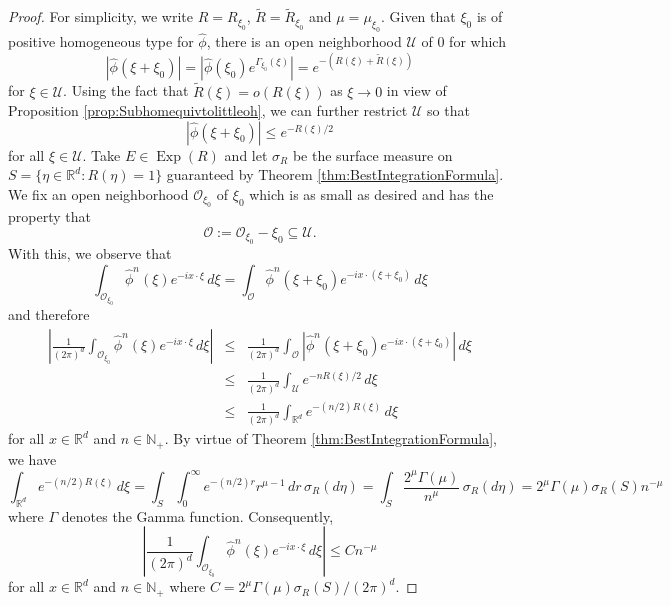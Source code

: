 \documentclass[11pt]{article}
\theoremstyle{remark}
\newcommand\Exp{\operatorname{Exp}}
\begin{document}
\begin{proof}
For simplicity, we write $R=R_{\xi_0}$, $\widetilde{R}=\widetilde{R}_{\xi_0}$ and $\mu=\mu_{\xi_0}$. Given that $\xi_0$ is of positive homogeneous type for $\widehat{\phi}$, there is an open neighborhood $\mathcal{U}$ of $0$ for which
\begin{equation*}
    \left|\widehat{\phi}(\xi+\xi_0)\right|=\left|\widehat{\phi}(\xi_0)e^{\Gamma_{\xi_0}(\xi)}\right|=e^{-\left(R(\xi)+\widetilde{R}(\xi)\right)}
\end{equation*}
for $\xi\in \mathcal{U}$. Using the fact that $\widetilde{R}(\xi)=o(R(\xi))$ as $\xi\to 0$ in view of Proposition \ref{prop:Subhomequivtolittleoh}, we can further restrict $\mathcal{U}$ so that
\begin{equation*}
    \left|\widehat{\phi}(\xi+\xi_0)\right|\leq e^{-R(\xi)/2}
\end{equation*}
for all $\xi\in\mathcal{U}$. Take $E\in\Exp(R)$ and let $\sigma_R$ be the surface measure on  $S=\{\eta\in\mathbb{R}^d:R(\eta)=1\}$ guaranteed by Theorem \ref{thm:BestIntegrationFormula}. We fix an open neighborhood $\mathcal{O}_{\xi_0}$ of $\xi_0$ which is as small as desired and has the property that
\begin{equation*}
    \mathcal{O}:=\mathcal{O}_{\xi_0}-\xi_0\subseteq\mathcal{U}.
\end{equation*}
With this, we observe that
\begin{equation}\label{eq:WlogCenterAtZero}
\int_{\mathcal{O}_{\xi_0}}\widehat{\phi}^n(\xi)e^{-ix\cdot\xi}\,d\xi=\int_{\mathcal{O}}\widehat{\phi}^n(\xi+\xi_0)e^{-ix\cdot(\xi+\xi_0)}\,d\xi
\end{equation}
and therefore
\begin{eqnarray*}
    \left|\frac{1}{(2\pi)^d}\int_{\mathcal{O}_{\xi_0}}\widehat{\phi}^n(\xi)e^{-ix\cdot\xi}\,d\xi\right|&\leq& \frac{1}{(2\pi)^d}\int_{\mathcal{O}}\left|\widehat{\phi}^n(\xi+\xi_0)e^{-i x\cdot(\xi+\xi_0)}\right|\,d\xi\\
    &\leq& \frac{1}{(2\pi)^d}\int_{\mathcal{U}}e^{-nR(\xi)/2}\,d\xi\\
    &\leq&\frac{1}{(2\pi)^d}\int_{\mathbb{R}^d} e^{-(n/2)R(\xi)}\,d\xi
\end{eqnarray*}
for all $x\in\mathbb{R}^d$ and $n\in\mathbb{N}_+$. By virtue of Theorem \ref{thm:BestIntegrationFormula}, we have
\begin{equation*}
\int_{\mathbb{R}^d}e^{-(n/2)R(\xi)}\,d\xi=\int_S \int_0^\infty e^{-(n/2)r}r^{\mu-1}\,dr\,\sigma_R(d\eta)=\int_S \frac{2^\mu\Gamma(\mu)}{n^{\mu}}\,\sigma_R(d\eta)=2^\mu\Gamma(\mu)\sigma_R(S)n^{-\mu}
\end{equation*}
where $\Gamma$ denotes the Gamma function. Consequently,
\begin{equation*}
    \left|\frac{1}{(2\pi)^d}\int_{\mathcal{O}_{\xi_0}}\widehat{\phi}^n(\xi)e^{-ix\cdot\xi}\,d\xi\right|\leq C n^{-\mu}
\end{equation*}
for all $x\in\mathbb{R}^d$ and $n\in\mathbb{N}_+$ where $C=2^\mu \Gamma(\mu)\sigma_R(S)/(2\pi)^d.$
\end{proof}
\end{document}
